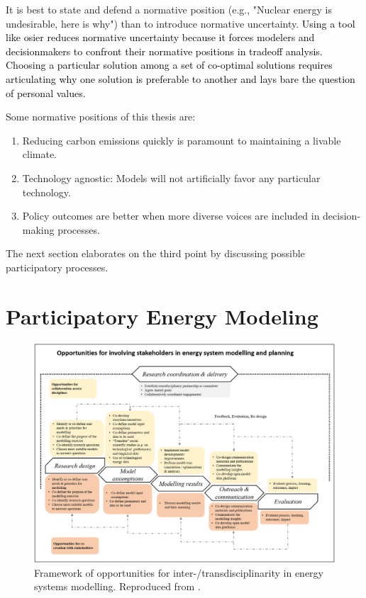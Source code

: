 It is best to state and defend a normative position (e.g., "Nuclear energy is
undesirable, here is why") than to introduce normative uncertainty.
\textcolor{black}{Using a tool like \ac{osier} reduces normative uncertainty
because it forces modelers and decisionmakers to confront their normative
positions in tradeoff analysis. Choosing a particular solution among a set of
co-optimal solutions requires articulating why one solution is preferable to
another and lays bare the question of personal values.}

Some normative positions of this thesis are:
\begin{enumerate}
    \item Reducing carbon emissions quickly is paramount to maintaining a
    livable climate.
    \item Technology agnostic: Models will not artificially favor any particular
    technology.
    \item Policy outcomes are better when more diverse voices are included in
    decision-making processes.
\end{enumerate}

The next section elaborates on the third point by discussing possible
participatory processes.

\section{Participatory Energy Modeling}
\label{section:participation-modeling}


\begin{figure}[ht!]
    \centering
    \includegraphics[width=\columnwidth]{figures/06_modeling_theory_chapter/participatory-modeling-flow-chart.jpg}
    \caption{Framework of opportunities for inter-/transdisciplinarity in energy
    systems modelling. Reproduced from \cite{mcgookin_advancing_2024}.}
    \label{fig:participatory-flow}
\end{figure}

